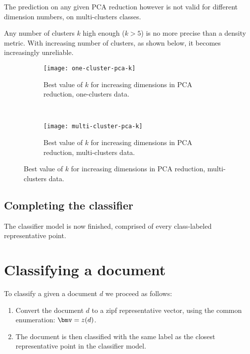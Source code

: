 \documentclass[\main/main.tex]{subfiles}
\begin{document}
The prediction on any given PCA reduction however is not valid for different dimension numbers, on multi-clusters classes.

Any number of clusters \(k\) high enough (\(k>5\)) is no more precise than a density metric. With increasing number of clusters, as shown below, it becomes increasingly unreliable.

\begin{figure}
	\begin{subfigure}{0.49\textwidth}
		\texttt{[image: one-cluster-pca-k]}
		\caption{Best value of \(k\) for increasing dimensions in PCA reduction, one-clusters data.}
	\end{subfigure}
	~
	\begin{subfigure}{0.49\textwidth}
		\texttt{[image: multi-cluster-pca-k]}
		\caption{Best value of \(k\) for increasing dimensions in PCA reduction, multi-clusters data.}
	\end{subfigure}
\end{figure}

\subsection{Completing the classifier}
The classifier model is now finished, comprised of every class-labeled representative point.


\section{Classifying a document}
To classify a given a document \(d\) we proceed as follows:
\begin{enumerate}
	\item Convert the document \(d\) to a zipf representative vector, using the common enumeration: \(\bmv = z(d)\).
	\item The document is then classified with the same label as the closest representative point in the classifier model.
\end{enumerate}
\end{document}
